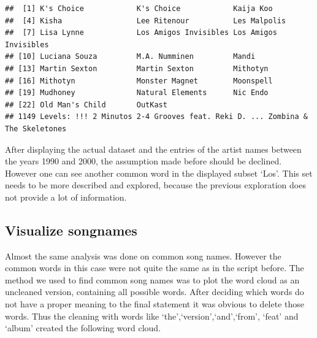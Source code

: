 \documentclass[]{article}
\newenvironment{Shaded}{\begin{snugshade}}{\end{snugshade}}
\newcommand{\DecValTok}[1]{\textcolor[rgb]{0.00,0.00,0.81}{#1}}
\newcommand{\StringTok}[1]{\textcolor[rgb]{0.31,0.60,0.02}{#1}}
\newcommand{\OperatorTok}[1]{\textcolor[rgb]{0.81,0.36,0.00}{\textbf{#1}}}
\newcommand{\NormalTok}[1]{#1}
\begin{document}
\begin{Shaded}
\end{Shaded}

\begin{verbatim}
##  [1] K's Choice            K's Choice            Kaija Koo            
##  [4] Kisha                 Lee Ritenour          Les Malpolis         
##  [7] Lisa Lynne            Los Amigos Invisibles Los Amigos Invisibles
## [10] Luciana Souza         M.A. Numminen         Mandi                
## [13] Martin Sexton         Martin Sexton         Mithotyn             
## [16] Mithotyn              Monster Magnet        Moonspell            
## [19] Mudhoney              Natural Elements      Nic Endo             
## [22] Old Man's Child       OutKast              
## 1149 Levels: !!! 2 Minutos 2-4 Grooves feat. Reki D. ... Zombina & The Skeletones
\end{verbatim}

After displaying the actual dataset and the entries of the artist names
between the years 1990 and 2000, the assumption made before should be
declined. However one can see another common word in the displayed
subset `Los'. This set needs to be more described and explored, because
the previous exploration does not provide a lot of information.

\subsection{Visualize songnames}\label{visualize-songnames}

Almost the same analysis was done on common song names. However the
common words in this case were not quite the same as in the script
before. The method we used to find common song names was to plot the
word cloud as an uncleaned version, containing all possible words. After
deciding which words do not have a proper meaning to the final statement
it was obvious to delete those words. Thus the cleaning with words like
`the',`version',`and',`from', `feat' and `album' created the following
word cloud.
\end{document}
